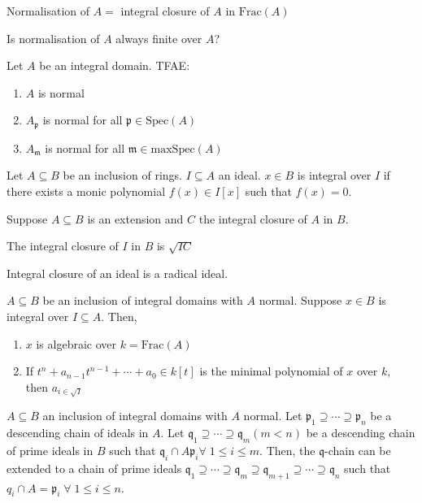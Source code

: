 \documentclass[oneside, 12pt]{scrbook}
\newcommand{\spec}{\mathrm{Spec}}
\newcommand{\pr}{\mathfrak{p}}
\newcommand{\m}{\mathfrak{m}}
\theoremstyle{theorem}
\begin{document}
Normalisation of $A=$ integral closure of $A$ in $\mathrm{Frac}(A)$
\begin{exercise}
Is normalisation of $A$ always finite over $A$?
\end{exercise}

\begin{example}

\end{example}

\begin{proposition}
Let $A$ be an integral domain. TFAE: 
\begin{enumerate}
\item $A$ is normal
\item $A_{\pr}$ is normal for all $\pr \in \spec(A)$
\item $A_{\m}$ is normal for all $\m \in \mathrm{maxSpec}(A)$
\end{enumerate}
\end{proposition}


Let $A \subseteq B$ be an inclusion of rings. $I \subseteq A$ an ideal. $x\in B$ is integral over $I$ if there exists a monic polynomial $f(x)\in I[x]$ such that $f(x)=0$.

Suppose $A \subseteq B$ is an extension and $C$ the integral closure of $A$ in $B$. 

\begin{proposition}
The integral closure of $I$ in $B$ is $\sqrt{IC}$
\end{proposition}

\begin{corollary}
Integral closure of an ideal is a radical ideal.
\end{corollary}

\begin{proposition}
$A \subseteq B$ be an inclusion of integral domains with $A$ normal. Suppose $x\in B$ is integral over $I \subseteq A$. Then, 
\begin{enumerate}
\item $x$ is algebraic over $k= \mathrm{Frac}(A)$
\item If $t^n + a_{n-1}t^{n-1} + \cdots + a_{0} \in k[t]$ is the minimal polynomial of $x$ over $k$, then $a_{i \in \sqrt{I}}$
\end{enumerate}
\end{proposition}

\begin{theorem}
$A\subseteq B$ an inclusion of integral domains with $A$ normal. Let $\pr_{1} \supseteq \cdots \supseteq \pr_{n}$ be a descending chain of ideals in $A$. Let $\mathfrak{q}_{1} \supseteq \cdots \supseteq \mathfrak{q}_{m} (m<n)$ be a descending chain of prime ideals in $B$ such that $\mathfrak{q}_{i} \cap A \pr_{i} \forall \; 1 \le i \le m$. Then, the $\mathfrak{q}$-chain can be extended to a chain of prime ideals $\mathfrak{q}_{1} \supseteq \cdots \supseteq \mathfrak{q}_{m} \supseteq \mathfrak{q}_{m+1} \supseteq \cdots \supseteq \mathfrak{q}_{n}$ such that $q_{i}\cap A = \pr_{i} \; \forall \; 1\le i \le n$. 
\end{theorem}
\end{document}
